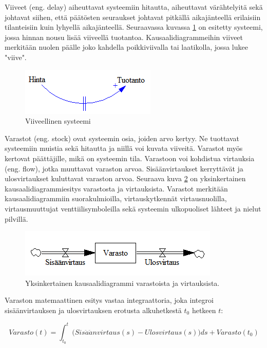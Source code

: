 \documentclass[finnish,12pt,a4paper,pdftex]{article}
\begin{document}
\begin{onehalfspacing}
Viiveet (eng. delay) aiheuttavat systeemiin hitautta, aiheuttavat värähtelyitä sekä johtavat siihen, että päätösten seuraukset johtavat pitkällä aikajänteellä erilaisiin tilanteisiin kuin lyhyellä aikajänteellä. Seuraavassa kuvassa \ref{sysdyn:viive} on esitetty systeemi, jossa hinnan nousu lisää viiveellä tuotantoa. Kausaalidiagrammeihin viiveet merkitään nuolen päälle joko kahdella poikkiviivalla tai laatikolla, jossa lukee "viive". \cite[s. 150--152]{Sterman2000} 

\begin{figure}[H]
\centering \includegraphics{viive}
\caption{Viiveellinen systeemi \cite[s. 150]{Sterman2000} \label{sysdyn:viive}}
\end{figure}

Varastot (eng. stock) ovat systeemin osia, joiden arvo kertyy. Ne tuottavat systeemiin muistia sekä hitautta ja niillä voi kuvata viiveitä. Varastot myös kertovat päättäjille, mikä on systeemin tila. Varastoon voi kohdistua virtauksia (eng. flow), jotka muuttavat varaston arvoa. Sisäänvirtaukset kerryttävät ja ulosvirtaukset kuluttavat varaston arvoa. Seuraava kuva \ref{sysdyn:varastovirtaus} on yksinkertainen kausaalidiagrammiesitys varastosta ja virtauksista. Varastot merkitään kausaalidiagrammiin suorakulmioilla, virtauskytkennät virtausnuolilla, virtausmuuttujat venttiilisymboleilla sekä systeemin ulkopuoliset lähteet ja nielut pilvillä. \cite[s. 191--197]{Sterman2000} 

\begin{figure}[H]
\centering \includegraphics{varastovirtaus}
\caption{Yksinkertainen kausaalidiagrammi varastoista ja virtauksista. \cite[s. 150]{Sterman2000} \label{sysdyn:varastovirtaus}}
\end{figure}

Varaston matemaattinen esitys vastaa integraattoria, joka integroi sisäänvirtauksen ja ulosvirtauksen erotusta alkuhetkestä $t_0$ hetkeen $t$: 

\begin{equation}
  Varasto(t) = \int_{t_0}^t \Big( Sis\ddot{a}\ddot{a}nvirtaus(s) - Ulosvirtaus(s) \Big) ds + Varasto(t_0)
\end{equation} \cite[s. 194--195]{Sterman2000} 


\end{onehalfspacing}
\end{document}
